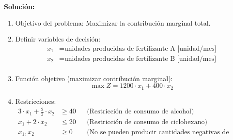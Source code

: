 \documentclass[../main.tex]{subfiles}
\begin{document}
\begin{exercise}
            \textbf{Solución:}
            \begin{enumerate}
                \item Objetivo del problema: Maximizar la contribución marginal total.
                \item Definir variables de decisión:
                    \begin{equation}
                        \begin{split}
                            x_1 &= \text{unidades producidas de fertilizante A [unidad/mes]} \\
                            x_2 &= \text{unidades producidas de fertilizante B [unidad/mes]} \\
                        \end{split}
                    \end{equation}
                \item Función objetivo (maximizar contribución marginal):
                    \begin{equation}
                        \max Z = 1200 \cdot x_1 + 400 \cdot x_2
                    \end{equation}
                \item Restricciones:
                    \begin{equation}
                        \begin{aligned}
                            3 \cdot x_1 + \frac{2}{3} \cdot x_2 &\geq 40 && \text{(Restricción de consumo de alcohol)} \\
                            x_1 + 2 \cdot x_2 &\leq 20 && \text{(Restricción de consumo de ciclohexano)}\\
                            x_1, x_2 & \geq 0 && \text{(No se pueden producir cantidades negativas de productos)}\\
                        \end{aligned}
                    \end{equation}


            \end{enumerate}

        \end{exercise}
\end{document}
